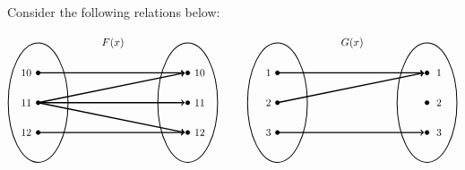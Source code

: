 \documentclass[12pt,letterpaper]{exam}
\begin{document}
\begin{questions}
\newpage



\question[6] Consider the following relations below:

	\[
	\begin{tikzpicture}
	\node at (2.5,2) {$F(x)$};
	
	\draw[line width=0.03cm] (0,0) circle (1 and 2);
	\draw[line width=0.03cm] (5,0) circle (1 and 2);
	
	\draw[fill=black] (0,1) circle (0.07);
	\draw[fill=black] (0,0) circle (0.07);
	\draw[fill=black] (0,-1) circle (0.07);
	
	\draw[fill=black] (5,1) circle (0.07);
	\draw[fill=black] (5,0) circle (0.07);
	\draw[fill=black] (5,-1) circle (0.07);
	
	\draw[line width=0.04cm,->] (0,1) -- (4.9,1);
	\draw[line width=0.04cm,->] (0,0) -- (4.9,1);
	\draw[line width=0.04cm,->] (0,0) -- (4.9,0);
	\draw[line width=0.04cm,->] (0,0) -- (4.9,-1);
	\draw[line width=0.04cm,->] (0,-1) -- (4.9,-1);
	
	\node at (-0.4,1) {$10$};
	\node at (-0.4,0) {$11$};
	\node at (-0.4,-1) {$12$};
	
	\node at (5.4,1) {$10$};
	\node at (5.4,0) {$11$};
	\node at (5.4,-1) {$12$};
	
	\tikzset{shift={(8,0)}}	
	
	\node at (2.5,2) {$G(x)$};
	
	\draw[line width=0.03cm] (0,0) circle (1 and 2);
	\draw[line width=0.03cm] (5,0) circle (1 and 2);
	
	\draw[fill=black] (0,1) circle (0.07);
	\draw[fill=black] (0,0) circle (0.07);
	\draw[fill=black] (0,-1) circle (0.07);
	
	\draw[fill=black] (5,1) circle (0.07);
	\draw[fill=black] (5,0) circle (0.07);
	\draw[fill=black] (5,-1) circle (0.07);
	
	\draw[line width=0.04cm,->] (0,1) -- (4.9,1);
	\draw[line width=0.04cm,->] (0,0) -- (4.9,1);
	\draw[line width=0.04cm,->] (0,-1) -- (4.9,-1);
	
	\node at (-0.3,1) {$1$};
	\node at (-0.3,0) {$2$};
	\node at (-0.3,-1) {$3$};
	
	\node at (5.4,1) {$1$};
	\node at (5.4,0) {$2$};
	\node at (5.4,-1) {$3$};
	\end{tikzpicture}
	\] \pspace


\end{questions}
\end{document}
